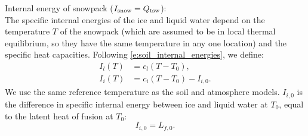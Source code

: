\documentclass{article}
\begin{document}
Internal energy of snowpack ($I_{\rm snow}= Q_{\rm tsw}$):\\
The specific internal energies of the ice and liquid water depend on the temperature $T$ of the snowpack (which are assumed to be in local thermal equilibrium, so they have the same temperature in any one location) and the specific heat capacities. Following \eqref{e:soil_internal_energies}, we define:
\begin{subequations}\label{e:snow_internal_energies}
\begin{align}
I_l(T) & = c_{l} (T - T_0), \\
I_i(T) & = c_{i} (T - T_0) - I_{i,0}.
\end{align}
\end{subequations}
We use the same reference temperature as the soil and atmosphere models.  $I_{i,0}$ is the difference in specific internal energy between ice and liquid water at $T_0$, equal to the latent heat of fusion at $T_0$: 
\begin{equation}
    I_{i,0} = L_{f,0}.
\end{equation} 
\end{document}

